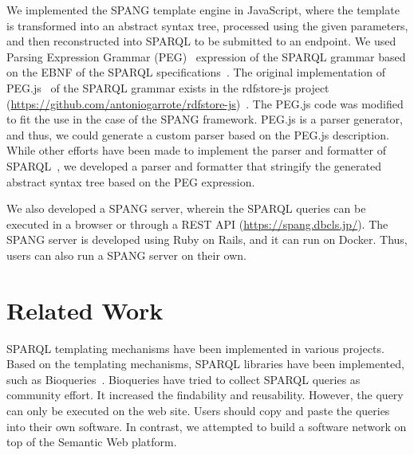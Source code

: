 \documentclass[runningheads]{llncs}
\begin{document}
We implemented the SPANG template engine in JavaScript, where the template is transformed into an abstract syntax tree, processed using the given parameters, and then reconstructed into SPARQL to be submitted to an endpoint. 
We used Parsing Expression Grammar (PEG)~\cite{peg} expression of the SPARQL grammar based on the EBNF of the SPARQL specifications~\cite{sparql}. The original implementation of PEG.js~\cite{pegjs} of the SPARQL grammar exists in the rdfstore-js project (\url{https://github.com/antoniogarrote/rdfstore-js})~\cite{rdfstore-js}.
The PEG.js code was modified to fit the use in the case of the SPANG framework.
PEG.js is a parser generator, and thus, we could generate a custom parser based on the PEG.js description. 
While other efforts have been made to implement the parser and formatter of SPARQL~\cite{sparql-js}, we developed a parser and formatter that stringify the generated abstract syntax tree based on the PEG expression. %

We also developed a SPANG server, wherein the SPARQL queries can be executed in a browser or through a REST API (\url{https://spang.dbcls.jp/}).
The SPANG server is developed using Ruby on Rails, and it can run on Docker.
Thus, users can also run a SPANG server on their own. 

\section{Related Work}

SPARQL templating mechanisms have been implemented in various projects. Based on the templating mechanisms, SPARQL libraries have been implemented, such as Bioqueries~\cite{bioqueries}. Bioqueries have tried to collect SPARQL queries as community effort. It increased the findability and reusability.
However, the query can only be executed on the web site.
Users should copy and paste the queries into their own software.
In contrast, we attempted to build a software network on top of the Semantic Web platform.
\end{document}

